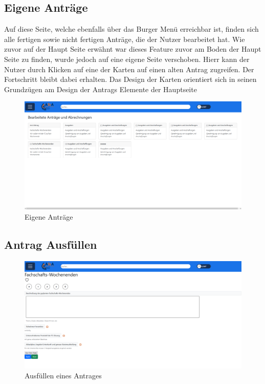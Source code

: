 \subsection{Eigene Anträge}\label{Eigene Anträge}

Auf diese Seite, welche ebenfalls über das Burger Menü erreichbar ist, finden sich alle 
fertigen sowie nicht fertigen Anträge, die der Nutzer bearbeitet hat. Wie zuvor auf der 
Haupt Seite erwähnt war dieses Feature zuvor am Boden der Haupt Seite zu finden, wurde 
jedoch auf eine eigene Seite verschoben. Hierr kann der Nutzer durch Klicken auf eine der 
Karten auf einen alten Antrag zugreifen. Der Fortschritt bleibt dabei erhalten. Das Design 
der Karten orientiert sich in seinen Grundzügen am Design der Antrags Elemente der 
Hauptseite

\begin{figure}
  \centering
    \includegraphics[width=1.0\textwidth]{Doc/images/Own Antraege.png}
    \caption{Eigene Anträge}\label{Eigene Daten}
\end{figure}

\subsection{Antrag Ausfüllen}\label{Antrag Ausfüllen}

\begin{figure}
  \centering
    \includegraphics[width=1.0\textwidth]{Doc/images/Fill in Antrag.png}
    \caption{Ausfüllen eines Antrages}\label{Ausfüllen eines Antrages}
\end{figure}

